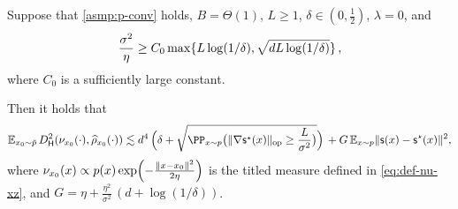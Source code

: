 \begin{corollary}\label{cor:DM-path-scfs-sqrt-d}
Suppose that \cref{asmp:p-conv} holds, $B=\Theta(1)$, $L\geq 1$, $\delta\in(0,\frac12)$, $\lambda=0$, and
\begin{align*}
    \frac{\sigma^2}{\eta}\geq C_0 \max\crl{L\log(1/\delta), \sqrt{dL\log(1/\delta)}}\,,
\end{align*}
where $C_0$ is a sufficiently large constant. 

Then it holds that 
\begin{align*}
\En_{\xz\sim \breve p} \Dhels{\piz{\cdot}}{\rhohz{\cdot}}
\leqsim d^4\,\prn[\Big]{ \delta+\sqrt{\PP_{x\sim p}\prn[\big]{\nrmop{\nabla \scfs(x)}\geq \frac{L}{\sigma^2}}} }\,+G\En_{x\sim p}\nrm{\scf(x)-\scfs(x)}^2,
\end{align*}
where $\piz{x}\propto p(x)\exp\prn[\Big]{-\frac{\nrm{x-\xz}^2}{2\eta}}$ is the titled measure defined in \cref{eq:def-nu-xz}, and $G=\eta+\frac{\eta^2}{\sigma^2}\,(d+\log(1/\delta))$.
\end{corollary}
